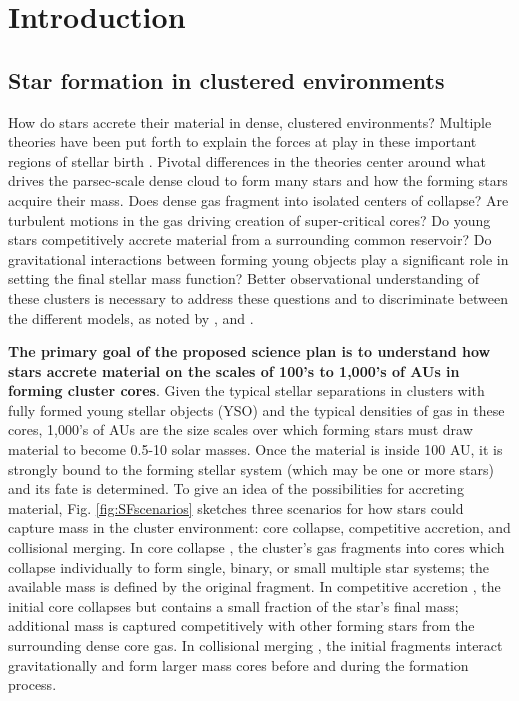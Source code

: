 \chapter{Introduction} %

\label{chap:introduction} %



\section{Star formation in clustered environments}

How do stars accrete their material in dense, clustered environments? Multiple theories have been put forth to explain the forces at play in these important regions of stellar birth \citep[e.g.][]{Bonnell:1997vta, McKee:2003gxa}. Pivotal differences in the theories center around what drives the parsec-scale dense cloud to form many stars and how the forming stars acquire their mass. Does dense gas fragment into isolated centers of collapse? Are turbulent motions in the gas driving creation of super-critical cores? Do young stars competitively accrete material from a surrounding common reservoir? Do gravitational interactions between forming young objects play a significant role in setting the final stellar mass function? Better observational understanding of these clusters is necessary to address these questions and to discriminate between the different models, as noted by \cite{Bonnell:2006ee}, \cite{Offner:2011ex} and \cite{Myers:2011fy}.

\textbf{The primary goal of the proposed science plan is to understand how stars accrete material on the scales of 100's to 1,000's of AUs in forming cluster cores}. Given the typical stellar separations in clusters with fully formed young stellar objects (YSO) and the typical densities of gas in these cores, 1,000's of AUs are the size scales over which forming stars must draw material to become 0.5-10 solar masses. Once the material is inside 100 AU, it is strongly bound to the forming stellar system (which may be one or more stars) and its fate is determined. To give an idea of the possibilities for accreting material, Fig. \ref{fig:SFscenarios} sketches three scenarios for how stars could capture mass in the cluster environment: core collapse, competitive accretion, and collisional merging. In core collapse \citep[Fig.~\ref{scenarios:a},][]{McKee:2003gxa, Myers:2011fy}, the cluster's gas fragments into cores which collapse individually to form single, binary, or small multiple star systems; the available mass is defined by the original fragment. In competitive accretion \citep[Fig.~\ref{scenarios:b},][]{Bonnell:1997vta}, the initial core collapses but contains a small fraction of the star's final mass; additional mass is captured competitively with other forming stars from the surrounding dense core gas. In collisional merging \citep[Fig.~\ref{scenarios:c},][]{Bonnell:2002et}, the initial fragments interact gravitationally and form larger mass cores before and during the formation process. 

